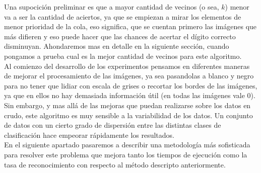 Una supocición preliminar es que a mayor cantidad de vecinos (o sea, $k$) menor va a ser la cantidad de aciertos, ya que se empiezan a mirar los elementos de menor prioridad de la cola, eso significa, que se cuentan primero las imágenes que más difieren y eso puede hacer que las chances de acertar el dígito correcto disminuyan. Ahondaremos mas en detalle en la siguiente sección, cuando pongamos a prueba cual es la mejor cantidad de vecinos para este algoritmo.
\\
Al comienzo del desarrollo de los experimentos pensamos en diferentes maneras de mejorar el procesamiento de las imágenes, ya sea pasandolas a blanco y negro para no tener que lidiar con escala de grises o recortar los bordes de las imágenes, ya que en ellos no hay demasiada información útil (en todas las imágenes vale 0).
\\
Sin embargo, y mas allá de las mejoras que puedan realizarse sobre los datos en crudo, este algoritmo es muy sensible a la variabilidad de los datos. Un conjunto de datos con un cierto grado de dispersión entre las distintas clases de clasificación hace empeorar rápidamente los resultados.
\\
En el siguiente apartado pasaremos a describir una metodología más sofisticada para resolver este problema que mejora tanto los tiempos de ejecución como la tasa de reconocimiento con respecto al método descripto anteriormente.

